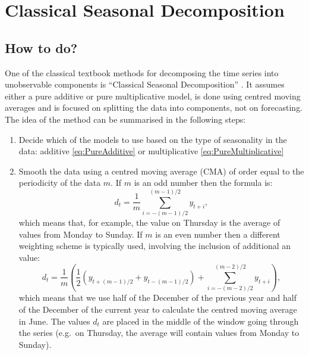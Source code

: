 \documentclass[
]{book}
\providecommand{\tightlist}{%
  \setlength{\itemsep}{0pt}\setlength{\parskip}{0pt}}
\theoremstyle{definition}
\theoremstyle{definition}
\theoremstyle{definition}
\theoremstyle{definition}
\theoremstyle{remark}
\begin{document}
\hypertarget{ClassicalDecomposition}{%
\section{Classical Seasonal Decomposition}\label{ClassicalDecomposition}}

\hypertarget{how-to-do}{%
\subsection{How to do?}\label{how-to-do}}

One of the classical textbook methods for decomposing the time series into unobservable components is ``Classical Seasonal Decomposition'' \citep{Persons1919}. It assumes either a pure additive or pure multiplicative model, is done using centred moving averages and is focused on splitting the data into components, not on forecasting. The idea of the method can be summarised in the following steps:

\begin{enumerate}
\def\labelenumi{\arabic{enumi}.}
\tightlist
\item
  Decide which of the models to use based on the type of seasonality in the data: additive \eqref{eq:PureAdditive} or multiplicative \eqref{eq:PureMultiplicative}
\item
  Smooth the data using a centred moving average (CMA) of order equal to the periodicity of the data \(m\). If \(m\) is an odd number then the formula is:
  \begin{equation}
   d_t = \frac{1}{m}\sum_{i=-(m-1)/2}^{(m-1)/2} y_{t+i},
   \label{eq:CMAOdd}
  \end{equation}
  which means that, for example, the value on Thursday is the average of values from Monday to Sunday. If \(m\) is an even number then a different weighting scheme is typically used, involving the inclusion of additional an value:
  \begin{equation}
   d_t = \frac{1}{m}\left(\frac{1}{2}\left(y_{t+(m-1)/2}+y_{t-(m-1)/2}\right) + \sum_{i=-(m-2)/2}^{(m-2)/2} y_{t+i}\right),
   \label{eq:CMAEven}
  \end{equation}
  which means that we use half of the December of the previous year and half of the December of the current year to calculate the centred moving average in June. The values \(d_t\) are placed in the middle of the window going through the series (e.g.~on Thursday, the average will contain values from Monday to Sunday).
\end{enumerate}
\end{document}
